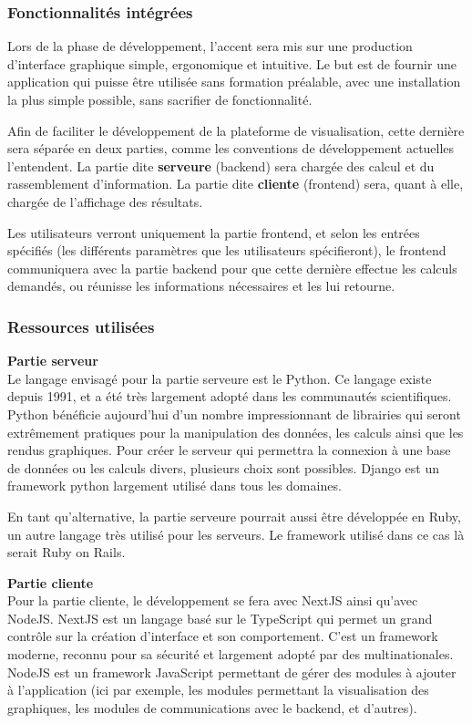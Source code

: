 \subsubsection{Fonctionnalités intégrées}
Lors de la phase de développement, l'accent sera mis sur une production d'interface graphique simple, ergonomique et intuitive.
Le but est de fournir une application qui puisse être utilisée sans formation préalable, avec une installation la plus simple possible, sans sacrifier de fonctionnalité.

Afin de faciliter le développement de la plateforme de visualisation, cette dernière sera séparée en deux parties, comme les conventions de développement actuelles l'entendent. 
La partie dite \textbf{serveure} (backend) sera chargée des calcul et du rassemblement d'information. 
La partie dite \textbf{cliente} (frontend) sera, quant à elle, chargée de l'affichage des résultats.

Les utilisateurs verront uniquement la partie frontend, et selon les entrées spécifiés (les différents paramètres que les utilisateurs spécifieront), le frontend communiquera avec la partie backend pour que cette dernière effectue les calculs demandés, ou réunisse les informations nécessaires et les lui retourne.

\subsubsection{Ressources utilisées}

\textbf{Partie serveur} \\
Le langage envisagé pour la partie serveure est le Python.
Ce langage existe depuis 1991, et a été très largement adopté dans les communautés scientifiques.
Python bénéficie aujourd'hui d'un nombre impressionnant de librairies qui seront extrêmement pratiques pour la manipulation des données, les calculs ainsi que les rendus graphiques.
Pour créer le serveur qui permettra la connexion à une base de données ou les calculs divers, plusieurs choix sont possibles.
Django est un framework python largement utilisé dans tous les domaines.

En tant qu'alternative, la partie serveure pourrait aussi être développée en Ruby, un autre langage très utilisé pour les serveurs.
Le framework utilisé dans ce cas là serait Ruby on Rails.

\textbf{Partie cliente} \\
Pour la partie cliente, le développement se fera avec NextJS ainsi qu'avec NodeJS.
NextJS est un langage basé sur le TypeScript qui permet un grand contrôle sur la création d'interface et son comportement.
C'est un framework moderne, reconnu pour sa sécurité et largement adopté par des multinationales.
NodeJS est un framework JavaScript permettant de gérer des modules à ajouter à l'application (ici par exemple, les modules permettant la visualisation des graphiques, les modules de communications avec le backend, et d'autres).

